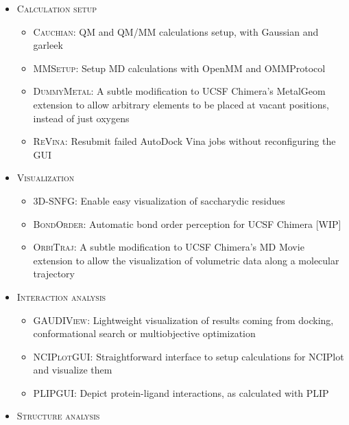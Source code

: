 \begin{itemize}
	\item \textsc{Calculation setup}

	\begin{itemize}
		\item \textsc{Cauchian}: QM and QM/MM calculations setup, with Gaussian and garleek

		\item \textsc{MMSetup}: Setup MD calculations with OpenMM and OMMProtocol

		\item \textsc{DummyMetal}: A subtle modification to UCSF Chimera’s MetalGeom extension to allow arbitrary elements to be placed at vacant positions, instead of just oxygens

		\item \textsc{ReVina}: Resubmit failed AutoDock Vina jobs without reconfiguring the GUI
	\end{itemize}

	\item \textsc{Visualization }
	\begin{itemize}
		\item \textsc{3D-SNFG}: Enable easy visualization of saccharydic residues

		\item \textsc{BondOrder}: Automatic bond order perception for UCSF Chimera [WIP]

		\item \textsc{OrbiTraj}: A subtle modification to UCSF Chimera’s MD Movie extension to allow the visualization of volumetric data along a molecular trajectory
	\end{itemize}

	\item \textsc{Interaction analysis}

	\begin{itemize}
		\item \textsc{GAUDIView}: Lightweight visualization of results coming from docking, conformational search or multiobjective optimization

		\item \textsc{NCIPlotGUI}: Straightforward interface to setup calculations for NCIPlot and visualize them

		\item \textsc{PLIPGUI}: Depict protein-ligand interactions, as calculated with PLIP
	\end{itemize}

	\item \textsc{Structure analysis}


\end{itemize}
